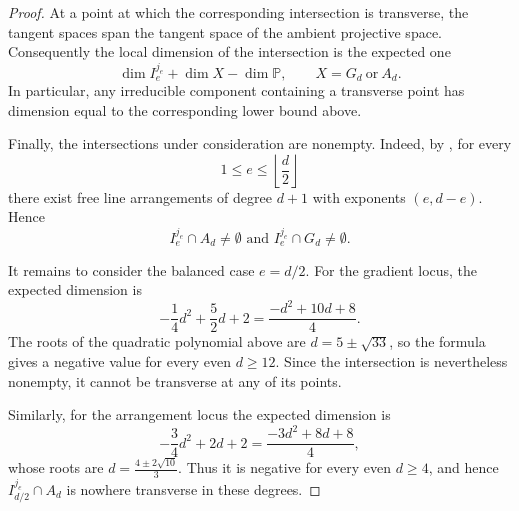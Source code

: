 \documentclass[11pt]{amsart} %
\theoremstyle{definition}
\begin{document}
\begin{proof}
At a point at which the corresponding intersection is transverse,
the tangent spaces span the tangent space of the ambient projective
space. Consequently the local dimension of the intersection is the
expected one
\[
\dim I_e^{j_e}+\dim X-\dim\mathbb P,
\qquad
X=G_d\ \text{or}\ A_d.
\]
In particular, any irreducible component containing a transverse
point has dimension equal to the corresponding lower bound above.

Finally, the intersections under consideration are nonempty.
Indeed, by
\cite[Theorems~1.1 and~1.2]{dimca2015exponents}, for every
\[
1\leq e\leq\left\lfloor\frac d2\right\rfloor
\]
there exist free line arrangements of degree $d+1$ with exponents
$(e,d-e)$. Hence
\[
I_e^{j_e}\cap A_d\neq\emptyset \text{ and }I_e^{j_e}\cap G_d\neq\emptyset.
\]

It remains to consider the balanced case $e=d/2$. For the gradient
locus, the expected dimension is
\[
-\frac14d^2+\frac52d+2
=
\frac{-d^2+10d+8}{4}.
\]
The roots of the quadratic polynomial above are \( d=5\pm\sqrt{33}\), so the formula gives a negative value for every even $d\geq12$. Since the intersection is nevertheless nonempty, it cannot be
transverse at any of its points.

Similarly, for the arrangement locus the expected dimension is
\[
-\frac34d^2+2d+2
=
\frac{-3d^2+8d+8}{4},
\]
whose roots are \(
d=\frac{4\pm2\sqrt{10}}{3}\). Thus it is negative for every even $d\geq4$, and hence
$I_{d/2}^{j_e}\cap A_d$ is nowhere transverse in these degrees.
\end{proof}
\end{document}
